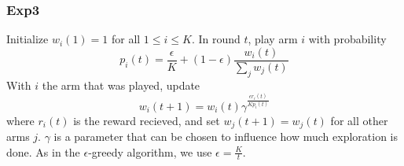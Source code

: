 \subsubsection{Exp3}
Initialize $w_i(1) = 1$ for all $1 \leq i \leq K$.  In round $t$, play
arm $i$ with probability
\[
	p_i(t) = \frac{\epsilon}{K} + (1 - \epsilon) \frac{w_i(t)}{\sum_j w_j(t)}
\]
With $i$ the arm that was played, update
\[
	w_i(t+1) = w_i(t)\gamma^{\frac{\epsilon r_i(t)}{K p_i(t)}}
\]
where $r_i(t)$ is the reward recieved, and set $w_j(t+1) = w_j(t)$ for all
other arms $j$.  $\gamma$ is a parameter that can be chosen to influence how
much exploration is done.  As in the $\epsilon$-greedy algorithm, we use
$\epsilon = \frac{K}{t}$.